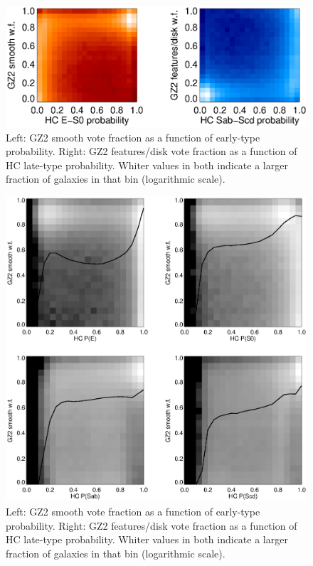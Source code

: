 \documentclass[useAMS,usenatbib]{mn2e}
\begin{document}
\begin{figure}
\includegraphics[angle=0,width=7.0in]{figures/hc_gz2.eps}
\caption{Left: GZ2 smooth vote fraction as a function of \citet{hue11} early-type probability. Right: GZ2 features/disk vote fraction as a function of HC late-type probability. Whiter values in both indicate a larger fraction of galaxies in that bin (logarithmic scale).
\label{fig-hc_gz2}}
\end{figure}

\begin{figure}
\includegraphics[angle=0,width=6.0in]{figures/hc_gz2_subclass.eps}
\caption{Left: GZ2 smooth vote fraction as a function of \citet{hue11} early-type probability. Right: GZ2 features/disk vote fraction as a function of HC late-type probability. Whiter values in both indicate a larger fraction of galaxies in that bin (logarithmic scale).
\label{fig-hc_gz2_subclass}}
\end{figure}
\end{document}
